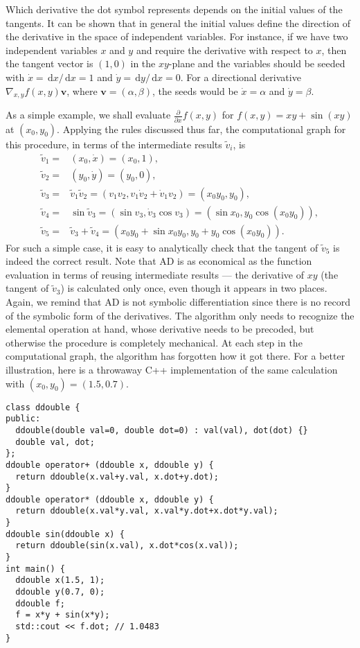 \documentclass{article}
\newcommand{\D}{\,\textrm{d}}
\begin{document}
Which derivative the dot symbol represents depends on the initial values of the tangents. It can be shown that in general the initial values define the direction of the derivative in the space of independent variables. For instance, if we have two independent variables $x$ and $y$ and require the derivative with respect to $x$, then the tangent vector is $(1,0)$ in the $xy$-plane and the variables should be seeded with $\dot x = \D x/\D x = 1$ and $\dot y = \D y/\D x = 0$. For a directional derivative $\nabla_{x,y}f(x,y) \bm v$, where $\bm v = (\alpha, \beta)$, the seeds would be $\dot x = \alpha$ and $\dot y = \beta$.

As a simple example, we shall evaluate $\frac{\partial}{\partial x} f(x, y)$ for $f(x, y) = x y + \sin (xy)$ at $(x_0,y_0)$. Applying the rules discussed thus far, the computational graph for this procedure, in terms of the intermediate results $\tilde v_i$, is
\begin{equation}
  \label{eq:forward_example}
  \begin{split}
    \tilde v_1 =& (x_0,\dot x) = (x_0,1), \\
    \tilde v_2 =& (y_0,\dot y) = (y_0,0), \\
    \tilde v_3 =& \tilde v_1\tilde v_2 = (v_1v_2, v_1 \dot v_2 +
    \dot v_1 v_2) = (x_0y_0, y_0), \\
    \tilde v_4 =& \sin \tilde v_3 = (\sin v_3, \dot v_3 \cos v_3) =
    (\sin x_0, y_0 \cos (x_0y_0)), \\
    \tilde v_5 =& \tilde v_3 + \tilde v_4 = (x_0y_0 + \sin x_0y_0, y_0
    + y_0 \cos (x_0y_0)).
  \end{split}
\end{equation}
For such a simple case, it is easy to analytically check that the tangent of $\tilde v_5$ is indeed the correct result. Note that AD is as economical as the function evaluation in terms of reusing intermediate results --- the derivative of $xy$ (the tangent of $\tilde v_3$) is calculated only once, even though it appears in two places. Again, we remind that AD is not symbolic differentiation since there is no record of the symbolic form of the derivatives. The algorithm only needs to recognize the elemental operation at hand, whose derivative needs to be precoded, but otherwise the procedure is completely mechanical. At each step in the computational graph, the algorithm has forgotten how it got there. For a better illustration, here is a throwaway C++ implementation of the same calculation with $(x_0,y_0) = (1.5,0.7)$.
\begin{verbatim}
class ddouble {
public:
  ddouble(double val=0, double dot=0) : val(val), dot(dot) {}
  double val, dot;
};
ddouble operator+ (ddouble x, ddouble y) {
  return ddouble(x.val+y.val, x.dot+y.dot);
}
ddouble operator* (ddouble x, ddouble y) {
  return ddouble(x.val*y.val, x.val*y.dot+x.dot*y.val);
}
ddouble sin(ddouble x) {
  return ddouble(sin(x.val), x.dot*cos(x.val));
}
int main() {
  ddouble x(1.5, 1);
  ddouble y(0.7, 0);
  ddouble f;
  f = x*y + sin(x*y);
  std::cout << f.dot; // 1.0483
}
\end{verbatim}
\end{document}
